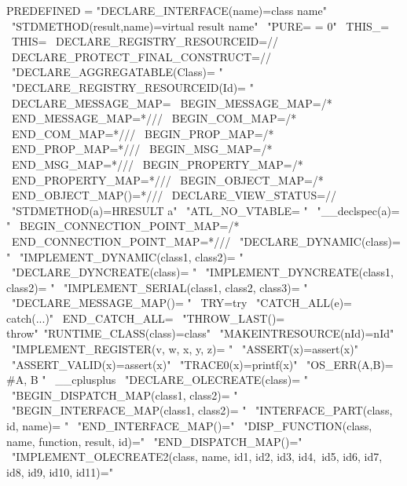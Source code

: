 \begin{DoxyVerb}
PREDEFINED           = "DECLARE_INTERFACE(name)=class name" \
                       "STDMETHOD(result,name)=virtual result name" \
                       "PURE= = 0" \
                       THIS_= \
                       THIS= \
                       DECLARE_REGISTRY_RESOURCEID=// \
                       DECLARE_PROTECT_FINAL_CONSTRUCT=// \
                       "DECLARE_AGGREGATABLE(Class)= " \
                       "DECLARE_REGISTRY_RESOURCEID(Id)= " \
                       DECLARE_MESSAGE_MAP= \
                       BEGIN_MESSAGE_MAP=/* \
                       END_MESSAGE_MAP=*/// \
                       BEGIN_COM_MAP=/* \
                       END_COM_MAP=*/// \
                       BEGIN_PROP_MAP=/* \
                       END_PROP_MAP=*/// \
                       BEGIN_MSG_MAP=/* \
                       END_MSG_MAP=*/// \
                       BEGIN_PROPERTY_MAP=/* \
                       END_PROPERTY_MAP=*/// \
                       BEGIN_OBJECT_MAP=/* \
                       END_OBJECT_MAP()=*/// \
                       DECLARE_VIEW_STATUS=// \
                       "STDMETHOD(a)=HRESULT a" \
                       "ATL_NO_VTABLE= " \
                       "__declspec(a)= " \
                       BEGIN_CONNECTION_POINT_MAP=/* \
                       END_CONNECTION_POINT_MAP=*/// \
                       "DECLARE_DYNAMIC(class)= " \
                       "IMPLEMENT_DYNAMIC(class1, class2)= " \
                       "DECLARE_DYNCREATE(class)= " \
                       "IMPLEMENT_DYNCREATE(class1, class2)= " \
                       "IMPLEMENT_SERIAL(class1, class2, class3)= " \
                       "DECLARE_MESSAGE_MAP()= " \
                       TRY=try \
                       "CATCH_ALL(e)= catch(...)" \
                       END_CATCH_ALL= \
                       "THROW_LAST()= throw"\
                       "RUNTIME_CLASS(class)=class" \
                       "MAKEINTRESOURCE(nId)=nId" \
                       "IMPLEMENT_REGISTER(v, w, x, y, z)= " \
                       "ASSERT(x)=assert(x)" \
                       "ASSERT_VALID(x)=assert(x)" \
                       "TRACE0(x)=printf(x)" \
                       "OS_ERR(A,B)={ #A, B }" \
                       __cplusplus \
                       "DECLARE_OLECREATE(class)= " \
                       "BEGIN_DISPATCH_MAP(class1, class2)= " \
                       "BEGIN_INTERFACE_MAP(class1, class2)= " \
                       "INTERFACE_PART(class, id, name)= " \
                       "END_INTERFACE_MAP()=" \
                       "DISP_FUNCTION(class, name, function, result, id)=" \
                       "END_DISPATCH_MAP()=" \
                       "IMPLEMENT_OLECREATE2(class, name, id1, id2, id3, id4,\
                        id5, id6, id7, id8, id9, id10, id11)="
\end{DoxyVerb}


